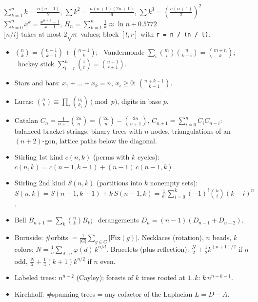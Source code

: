 {
$\sum_{k=1}^n k = \frac{n(n+1)}{2}$, \quad
$\sum k^2 = \frac{n(n+1)(2n+1)}{6}$, \quad
$\sum k^3 = \left(\frac{n(n+1)}{2}\right)^2$ \\
$\sum_{k=0}^{n} x^k = \frac{x^{n+1}-1}{x-1}$, \quad
$H_n = \sum_{k=1}^n \frac1k \approx \ln n + 0.5772$ \\
$\lfloor n/i \rfloor$ takes at most $2\sqrt n$ values; block $[l, r]$ with
\texttt{r = n / (n / l)}.

\begin{itemize}
  \item $\binom{n}{k} = \binom{n-1}{k-1} + \binom{n-1}{k}$; \
        Vandermonde $\sum_i \binom{m}{i}\binom{n}{k-i} = \binom{m+n}{k}$; \
        hockey stick $\sum_{i=r}^{n} \binom{i}{r} = \binom{n+1}{r+1}$.
  \item Stars and bars: $x_1 + \dots + x_k = n$, $x_i \ge 0$: $\binom{n+k-1}{k-1}$.
  \item Lucas: $\binom{n}{k} \equiv \prod_i \binom{n_i}{k_i} \pmod p$, digits in base $p$.
  \item Catalan $C_n = \frac{1}{n+1}\binom{2n}{n} = \binom{2n}{n} - \binom{2n}{n+1}$,
        $C_{n+1} = \sum_{i=0}^{n} C_i C_{n-i}$: balanced bracket strings, binary trees with
        $n$ nodes, triangulations of an $(n+2)$-gon, lattice paths below the diagonal.
  \item Stirling 1st kind $c(n,k)$ (perms with $k$ cycles):
        $c(n,k) = c(n-1,k-1) + (n-1)\,c(n-1,k)$.
  \item Stirling 2nd kind $S(n,k)$ (partitions into $k$ nonempty sets):
        $S(n,k) = S(n-1,k-1) + k\,S(n-1,k) = \frac{1}{k!}\sum_{i=0}^{k} (-1)^i \binom{k}{i}(k-i)^n$.
  \item Bell $B_{n+1} = \sum_k \binom{n}{k} B_k$; \
        derangements $D_n = (n-1)(D_{n-1} + D_{n-2})$.
  \item Burnside: \#orbits $= \frac{1}{|G|}\sum_{g \in G} |\mathrm{Fix}(g)|$.
        Necklaces (rotation), $n$ beads, $k$ colors: $N = \frac1n \sum_{d \mid n} \varphi(d)\, k^{n/d}$.
        Bracelets (plus reflection): $\frac N2 + \frac12 k^{(n+1)/2}$ if $n$ odd,
        $\frac N2 + \frac14 (k+1)k^{n/2}$ if $n$ even.
  \item Labeled trees: $n^{n-2}$ (Cayley); forests of $k$ trees rooted at $1..k$: $k\,n^{n-k-1}$.
  \item Kirchhoff: \#spanning trees = any cofactor of the Laplacian $L = D - A$.
\end{itemize}

}
